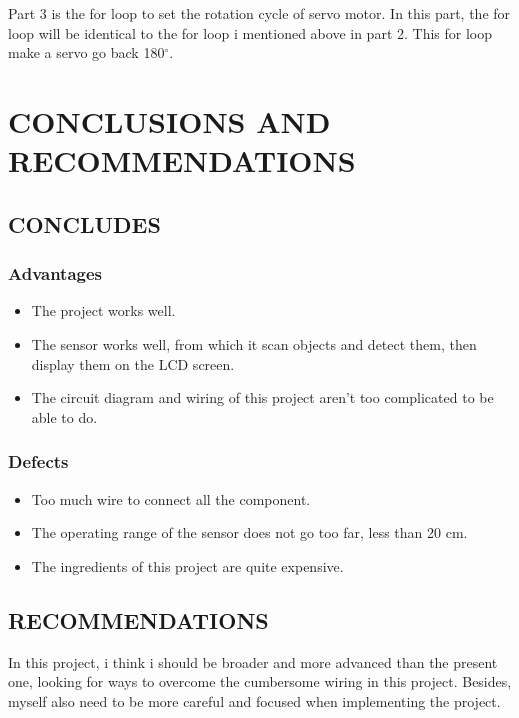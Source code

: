\documentclass[a4paper,13pt]{report}
\begin{document}
        \vspace{2mm}
        \linebreak
        Part 3 is the for loop to set the rotation cycle of servo motor. In this part, the for 
        loop will be identical to the for loop i mentioned above in part 2. This for loop make 
        a servo go back 180$^{\circ}$. 

    \chapter{CONCLUSIONS AND RECOMMENDATIONS}
    \renewcommand{\headrulewidth}{0.5pt}
    \renewcommand{\footrulewidth}{0.5pt}
    \thispagestyle{fancy}
    \fancyhf{}
    \raggedright
        \section{CONCLUDES}
            \subsection{\large{Advantages}}
                \begin{itemize}
                    \item The project works well.
                    \item The sensor works well, from which it scan objects and detect them, then 
                    display them on the LCD screen.
                    \item The circuit diagram and wiring of this project aren't too complicated to be 
                    able to do.
                \end{itemize}
            \subsection{\large{Defects}}
                \begin{itemize}
                    \item Too much wire to connect all the component.
                    \item The operating range of the sensor does not go too far, less than 20 cm.
                    \item The ingredients of this project are quite expensive.
                \end{itemize}
        \section{RECOMMENDATIONS}
            In this project, i think i should be broader and more advanced than the present one, 
            looking for ways to overcome the cumbersome wiring in this project. Besides, myself also 
            need to be more careful and focused when implementing the project.
\end{document}
